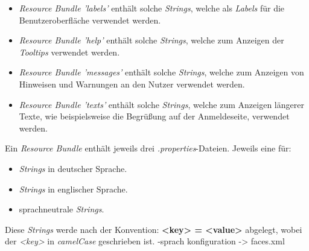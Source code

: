 \begin{itemize}
    \item \emph{Resource Bundle 'labels'} enthält solche \emph{Strings}, welche als \emph{Labels} für die Benutzeroberfläche verwendet
    werden.
    \item \emph{Resource Bundle 'help'} enthält solche \emph{Strings}, welche zum Anzeigen der \emph{Tooltips} verwendet
    werden.
    \item \emph{Resource Bundle 'messages'} enthält solche \emph{Strings}, welche zum Anzeigen von Hinweisen und Warnungen
    an den Nutzer verwendet werden.
    \item \emph{Resource Bundle 'texts'} enthält solche \emph{Strings}, welche zum Anzeigen längerer Texte, wie beispielsweise die
    Begrüßung auf der Anmeldeseite, verwendet werden.
\end{itemize}

Ein \emph{Resource Bundle} enthält jeweils drei \emph{.properties}-Dateien.
Jeweils eine für:
\begin{itemize}
    \item \emph{Strings} in deutscher Sprache.
    \item \emph{Strings} in englischer Sprache.
    \item sprachneutrale \emph{Strings}.
\end{itemize}

Diese \emph{Strings} werde nach der Konvention:
\textbf{<key> = <value>} %
abgelegt, wobei der \emph{<key>} in \emph{camelCase} geschrieben ist.
-sprach konfiguration -> faces.xml %